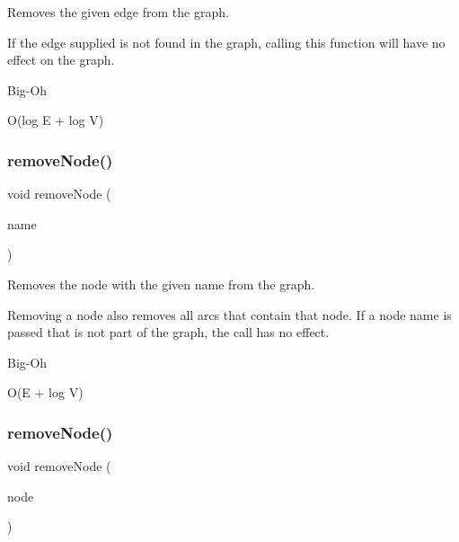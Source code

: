 Removes the given edge from the graph. 

If the edge supplied is not found in the graph, calling this function will have no effect on the graph. \begin{DoxyRefDesc}{Big-\/\+Oh}
\item[\mbox{\hyperlink{BigOh__BigOh000031}{Big-\/\+Oh}}]O(log E + log V) \end{DoxyRefDesc}
\mbox{\label{classGraph_a2d5f7ee89176144ed4c5c6b08a233aa6}} 
\subsubsection{\texorpdfstring{remove\+Node()}{removeNode()}\hspace{0.1cm}{\footnotesize\ttfamily [1/2]}}
{\footnotesize\ttfamily void remove\+Node (\begin{DoxyParamCaption}\item[{const std\+::string \&}]{name }\end{DoxyParamCaption})\hspace{0.3cm}{\ttfamily [inherited]}}



Removes the node with the given name from the graph. 

Removing a node also removes all arcs that contain that node. If a node name is passed that is not part of the graph, the call has no effect. \begin{DoxyRefDesc}{Big-\/\+Oh}
\item[\mbox{\hyperlink{BigOh__BigOh000087}{Big-\/\+Oh}}]O(E + log V) \end{DoxyRefDesc}
\mbox{\label{classGraph_a2dfe63019975561914e0ed79551de108}} 
\subsubsection{\texorpdfstring{remove\+Node()}{removeNode()}\hspace{0.1cm}{\footnotesize\ttfamily [2/2]}}
{\footnotesize\ttfamily void remove\+Node (\begin{DoxyParamCaption}\item[{\mbox{\hyperlink{classVertexGen}{Vertex\+Gen}}$<$ V, E $>$  $\ast$}]{node }\end{DoxyParamCaption})\hspace{0.3cm}{\ttfamily [inherited]}}



